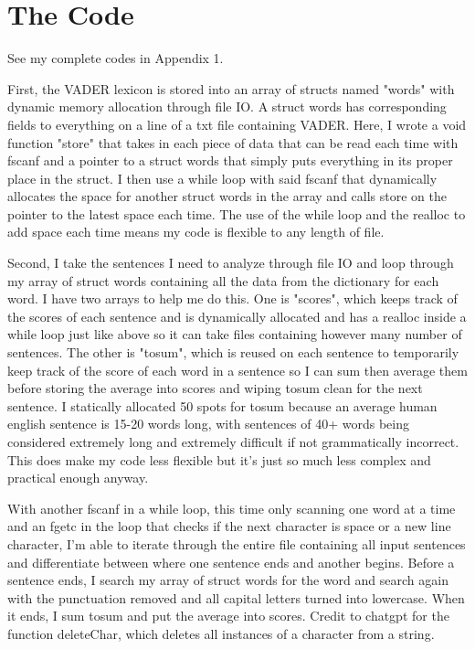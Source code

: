 \documentclass{article}
\begin{document}
\section{The Code}

See my complete codes in Appendix 1. 

First, the VADER lexicon is stored into an array of structs named "words" with dynamic memory allocation through file IO. A struct words has corresponding fields to everything on a line of a txt file containing VADER. Here, I wrote a void function "store" that takes in each piece of data that can be read each time with fscanf and a pointer to a struct words that simply puts everything in its proper place in the struct. I then use a while loop with said fscanf that dynamically allocates the space for another struct words in the array and calls store on the pointer to the latest space each time. The use of the while loop and the realloc to add space each time means my code is flexible to any length of file. 

Second, I take the sentences I need to analyze through file IO and loop through my array of struct words containing all the data from the dictionary for each word. I have two arrays to help me do this. One is "scores", which keeps track of the scores of each sentence and is dynamically allocated and has a realloc inside a while loop just like above so it can take files containing however many number of sentences. The other is "tosum", which is reused on each sentence to temporarily keep track of the score of each word in a sentence so I can sum then average them before storing the average into scores and wiping tosum clean for the next sentence. I statically allocated 50 spots for tosum because an average human english sentence is 15-20 words long, with sentences of 40+ words being considered extremely long and extremely difficult if not grammatically incorrect. This does make my code less flexible but it's just so much less complex and practical enough anyway. 

With another fscanf in a while loop, this time only scanning one word at a time and an fgetc in the loop that checks if the next character is space or a new line character, I'm able to iterate through the entire file containing all input sentences and differentiate between where one sentence ends and another begins. Before a sentence ends, I search my array of struct words for the word and search again with the punctuation removed and all capital letters turned into lowercase. When it ends, I sum tosum and put the average into scores. Credit to chatgpt for the function deleteChar, which deletes all instances of a character from a string. 
\end{document}
